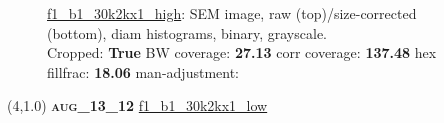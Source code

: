 \begin{figure}[h!]
\label{semimg6}
\caption*{\hyperlink{covtableaug_13_12}{\color{blue} \small \ttfamily f1\_b1\_30k2kx1\_high}: SEM image, raw (top)/size-corrected (bottom), diam histograms, binary, grayscale.\\Cropped: {\bf True} \;\; BW coverage: {\bf 27.13} \:\: corr coverage: {\bf 137.48} \:\: hex fillfrac: {\bf 18.06} \:\: man-adjustment: {\bf \color{blue}{Yes}}}
\end{figure}
\newpage

\begin{textblock}{5}(4,1.0)
{\bf \textsc{aug\_13\_12}}
\hspace{4.5cm}
\hyperlink{covtableaug_13_12}{\color{blue} \large \ttfamily f1\_b1\_30k2kx1\_low}
\end{textblock}

